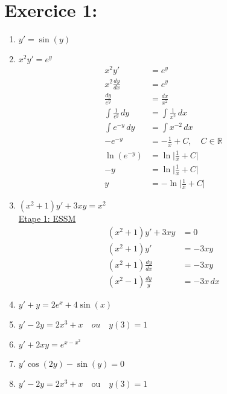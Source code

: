 \documentclass[a4paper,12pt]{article}
\begin{document}
\section*{Exercice 1:}
\begin{enumerate}
	\item $y' = \sin(y)$

	\item $x^2 y' = e^y$ \\
		\begin{align*}
			x^2 y' &= e^y \\
			x^2 \frac{dy}{dx} &= e^y \\
			\frac{dy}{e^y} &= \frac{dx}{x^2} \\
			\int \frac{1}{e^{y}} \, dy &= \int \frac{1}{x^{2}} \, dx \\
			\int e^{-y}\,dy &= \int x^{-2} \, dx \\
			-e^{-y} &= -\frac{1}{x} + C, \quad C \in \mathbb{R} \\
			\ln(e^{-y}) &= \ln \lvert \frac{1}{x} + C \rvert \\
			-y &= \ln \lvert \frac{1}{x} + C \rvert \\
			y &= -\ln \lvert \frac{1}{x} + C \rvert
		\end{align*}


	\item $(x^2 + 1) y' + 3xy = x^2$ \\
		\underline{Etape 1: ESSM} \\
		\begin{align*}
			(x^2+1)y' + 3xy &= 0  \\
			(x^2+1)y' &= -3xy  \\
			(x^2+1) \frac{dy}{dx} &= -3xy \\
			(x^2-1) \frac{dy}{y} &= -3x \,dx 			
		\end{align*}

	\item $y' + y = 2e^x + 4 \sin(x)$

	\item $y' - 2y = 2x^3 + x \quad ou \quad y(3)=1$

	\item $y' + 2xy = e^{x-x^2}$

	\item $y' \cos(2y) - \sin(y) = 0$

	\item $y' - 2y = 2x^3 + x \quad \text{ou} \quad y(3)=1$
\end{enumerate}
\end{document}
